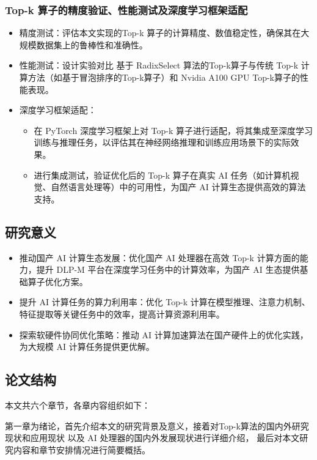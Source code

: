 \subsubsection{Top-k 算子的精度验证、性能测试及深度学习框架适配}
\begin{itemize}
    \item 精度测试：评估本文实现的Top-k 算子的计算精度、数值稳定性，确保其在大规模数据集上的鲁棒性和准确性。
    \item 性能测试：设计实验对比 基于 RadixSelect 算法的Top-k算子与传统 Top-k 计算方法（如基于冒泡排序的Top-k算子）和 Nvidia A100 GPU Top-k算子的性能表现。
    \item 深度学习框架适配：
          \begin{itemize}
              \item 在 PyTorch 深度学习框架上对 Top-k 算子进行适配，将其集成至深度学习训练与推理任务，以评估其在神经网络推理和训练应用场景下的实际效果。
              \item 进行集成测试，验证优化后的 Top-k 算子在真实 AI 任务（如计算机视觉、自然语言处理等）中的可用性，为国产 AI 计算生态提供高效的算法支持。
          \end{itemize}
\end{itemize}

\subsection{研究意义}
\begin{itemize}
    \item 推动国产 AI 计算生态发展：优化国产 AI 处理器在高效 Top-k 计算方面的能力，提升 DLP-M 平台在深度学习任务中的计算效率，为国产 AI 生态提供基础算子优化方案。
    \item 提升 AI 计算任务的算力利用率：优化 Top-k 计算在模型推理、注意力机制、特征提取等关键任务中的效率，提高计算资源利用率。
    \item 探索软硬件协同优化策略：推动 AI 计算加速算法在国产硬件上的优化实践，为大规模 AI 计算任务提供更优解。
\end{itemize}


\subsection{论文结构}

本文共六个章节，各章内容组织如下： 

第一章为绪论，首先介绍本文的研究背景及意义，接着对Top-k算法的国内外研究现状和应用现状
以及 AI 处理器的国内外发展现状进行详细介绍，
最后对本文研究内容和章节安排情况进行简要概括。

